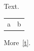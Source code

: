 \documentclass{article}
\begin{document}
Text.
\begin{margintable}
  \begin{tabular}{ll}a&b\end{tabular}
  \caption{A margin table.\label{t}}
\end{margintable}
More~\ref{t}.
\end{document}
